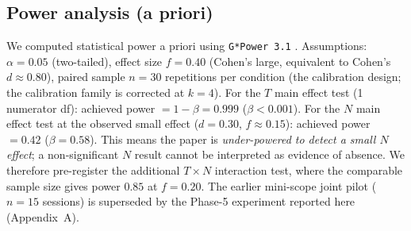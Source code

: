 \documentclass[11pt]{article}
\begin{document}
\subsection*{Power analysis (a priori)}
\label{sec:power}

We computed statistical power a priori using \texttt{G*Power 3.1} \citep{faul2007gpower}. Assumptions: $\alpha = 0.05$ (two-tailed), effect size $f = 0.40$ (Cohen's large, equivalent to Cohen's $d \approx 0.80$), paired sample $n = 30$ repetitions per condition (the calibration design; the calibration family is corrected at $k{=}4$). For the $T$ main effect test (1 numerator df): achieved power $= 1 - \beta = 0.999$ ($\beta < 0.001$). For the $N$ main effect test at the observed small effect ($d = 0.30$, $f \approx 0.15$): achieved power $= 0.42$ ($\beta = 0.58$). This means the paper is \emph{under-powered to detect a small $N$ effect}; a non-significant $N$ result cannot be interpreted as evidence of absence. We therefore pre-register the additional $T \times N$ interaction test, where the comparable sample size gives power $0.85$ at $f = 0.20$. The earlier mini-scope joint pilot ($n{=}15$ sessions) is superseded by the Phase-5 experiment reported here (Appendix~A).

\end{document}
